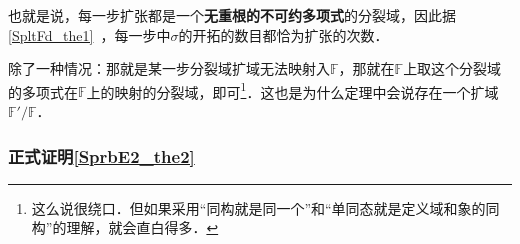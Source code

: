 也就是说，每一步扩张都是一个\textbf{无重根的不可约多项式}的分裂域，因此据\autoref{SpltFd_the1}~，每一步中$\sigma$的开拓的数目都恰为扩张的次数．

除了一种情况：那就是某一步分裂域扩域无法映射入$\mathbb{F}$，那就在$\mathbb{F}$上取这个分裂域的多项式在$\mathbb{F}$上的映射的分裂域，即可\footnote{这么说很绕口．但如果采用“同构就是同一个”和“单同态就是定义域和象的同构”的理解，就会直白得多．}．这也是为什么定理中会说存在一个扩域$\mathbb{F}'/\mathbb{F}$．




\subsubsection{正式证明\autoref{SprbE2_the2} }


















